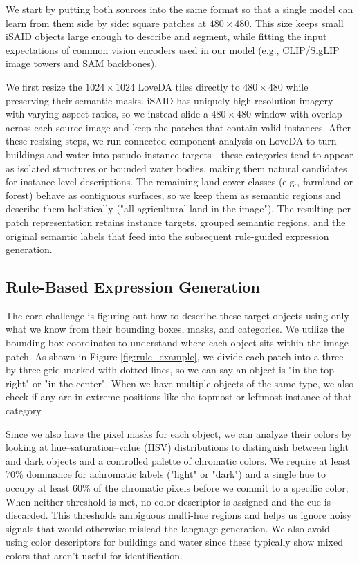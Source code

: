 \documentclass[journal]{IEEEtran}
\begin{document}
We start by putting both sources into the same format so that a single model can learn from them side by side: square patches at $480\times480$. This size keeps small iSAID objects large enough to describe and segment, while fitting the input expectations of common vision encoders used in our model (e.g., CLIP/SigLIP image towers and SAM backbones\cite{clip,siglip,sam}).

We first resize the $1024\times1024$ LoveDA tiles directly to $480\times480$ while preserving their semantic masks. iSAID has uniquely high-resolution imagery with varying aspect ratios, so we instead slide a $480\times480$ window with overlap across each source image and keep the patches that contain valid instances. After these resizing steps, we run connected-component analysis on LoveDA to turn buildings and water into pseudo-instance targets—these categories tend to appear as isolated structures or bounded water bodies, making them natural candidates for instance-level descriptions. The remaining land-cover classes (e.g., farmland or forest) behave as contiguous surfaces, so we keep them as semantic regions and describe them holistically ("all agricultural land in the image"). The resulting per-patch representation retains instance targets, grouped semantic regions, and the original semantic labels that feed into the subsequent rule-guided expression generation.

\subsection{Rule-Based Expression Generation}

The core challenge is figuring out how to describe these target objects using only what we know from their bounding boxes, masks, and categories. We utilize the bounding box coordinates to understand where each object sits within the image patch. As shown in Figure \ref{fig:rule_example}, we divide each patch into a three-by-three grid marked with dotted lines, so we can say an object is "in the top right" or "in the center". When we have multiple objects of the same type, we also check if any are in extreme positions like the topmost or leftmost instance of that category.

Since we also have the pixel masks for each object, we can analyze their colors by looking at hue--saturation--value (HSV) distributions to distinguish between light and dark objects and a controlled palette of chromatic colors. We require at least 70\% dominance for achromatic labels ("light" or "dark") and a single hue to occupy at least 60\% of the chromatic pixels before we commit to a specific color; When neither threshold is met, no color descriptor is assigned and the cue is discarded. This thresholds ambiguous multi-hue regions and helps us ignore noisy signals that would otherwise mislead the language generation. We also avoid using color descriptors for buildings and water since these typically show mixed colors that aren't useful for identification.
\end{document}
